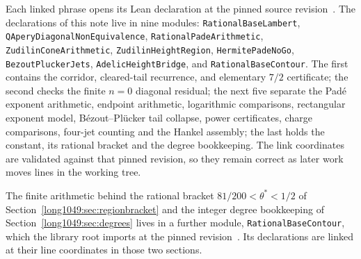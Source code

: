 Each linked phrase opens its Lean declaration at the pinned source
revision~\commitshort.  The declarations of this note live in nine modules:
\texttt{RationalBaseLambert}, \texttt{QAperyDiagonalNonEquivalence},
\texttt{RationalPadeArithmetic}, \texttt{ZudilinConeArithmetic},
\texttt{ZudilinHeightRegion}, \texttt{HermitePadeNoGo},
\texttt{BezoutPluckerJets}, \texttt{AdelicHeightBridge}, and
\texttt{RationalBaseContour}.  The first contains
the corridor, cleared-tail recurrence, and elementary $7/2$ certificate; the
second checks the finite $n=0$ diagonal residual; the next five separate
the Pad\'e exponent arithmetic, endpoint arithmetic, logarithmic comparisons,
rectangular exponent model, B\'ezout--Pl\"ucker tail collapse, power
certificates, charge comparisons, four-jet counting and the Hankel assembly;
the last holds the constant, its rational bracket and the degree bookkeeping.
The link
coordinates are validated against that pinned revision, so they remain correct
as later work moves lines in the working tree.

The finite arithmetic behind the rational bracket
$81/200<\theta^{*}<1/2$ of Section~\ref{long1049:sec:regionbracket} and the integer
degree bookkeeping of Section~\ref{long1049:sec:degrees} lives in a further module,
\texttt{RationalBaseContour}, which the library root imports at the pinned
revision~\commitshort.  Its declarations are linked at their line coordinates in
those two sections.

\iffalse

